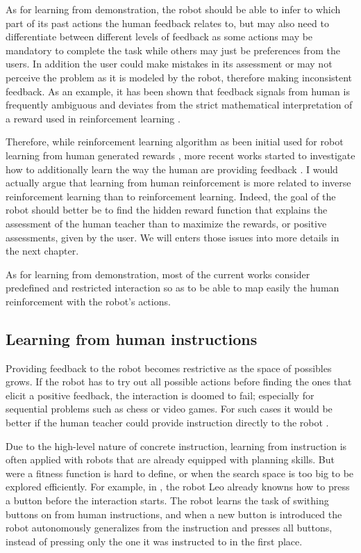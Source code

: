As for learning from demonstration, the robot should be able to infer to which part of its past actions the human feedback relates to, but may also need to differentiate between different levels of feedback as some actions may be mandatory to complete the task while others may just be preferences from the users. In addition the user could make mistakes in its assessment or may not perceive the problem as it is modeled by the robot, therefore making inconsistent feedback. As an example, it has been shown that feedback signals from human is frequently ambiguous and deviates from the strict mathematical interpretation of a reward used in reinforcement learning \cite{thomaz2008teachable,Cakmak2010optimality}.

Therefore, while reinforcement learning algorithm as been initial used for robot learning from human generated rewards \cite{thomaz2008teachable}, more recent works started to investigate how to additionally learn the way the human are providing feedback \cite{knox2009interactively}. I would actually argue that learning from human reinforcement is more related to inverse reinforcement learning than to reinforcement learning. Indeed, the goal of the robot should better be to find the hidden reward function that explains the assessment of the human teacher than to maximize the rewards, or positive assessments, given by the user. We will enters those issues into more details in the next chapter.

As for learning from demonstration, most of the current works consider predefined and restricted interaction so as to be able to map easily the human reinforcement with the robot's actions.

\subsection{Learning from human instructions}

Providing feedback to the robot becomes restrictive as the space of possibles grows. If the robot has to try out all possible actions before finding the ones that elicit a positive feedback, the interaction is doomed to fail; especially for sequential problems such as chess or video games. For such cases it would be better if the human teacher could provide instruction directly to the robot \cite{breazeal2004tutelage}.

Due to the high-level nature of concrete instruction, learning from instruction is often applied with robots that are already equipped with planning skills. But were a fitness function is hard to define, or when the search space is too big to be explored efficiently. For example, in \cite{lockerd2004tutelage}, the robot Leo already knowns how to press a button before the interaction starts. The robot learns the task of swithing buttons on from human instructions, and when a new button is introduced the robot autonomously generalizes from the instruction and presses all buttons, instead of pressing only the one it was instructed to in the first place. 

